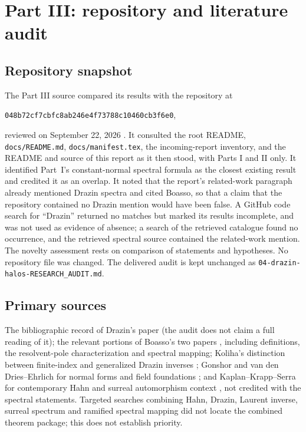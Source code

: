 \documentclass[11pt,a4paper]{article}
\numberwithin{equation}{section}
\theoremstyle{definition}
\theoremstyle{remark}
\newcommand{\commitC}{048b72cf7cbfc8ab246e4f73788c10460cb3f6e0}
\begin{document}
\section{Part III: repository and literature audit}\label{ihs:app:auditC}

\subsection{Repository snapshot}\label{ihs:app:snapshotC}
The Part III source compared its results with the repository at
\begin{center}\small\texttt{\commitC},\end{center}
reviewed on September 22, 2026 \cite{RepoPinC}. It consulted the root
README, \texttt{docs/README.md}, \texttt{docs/manifest.tex}, the
incoming-report inventory, and the README and source of this report as it
then stood, with Parts I and II only. It identified Part~I's
constant-normal spectral formula as the closest existing result and credited
it as an overlap. It noted that the report's related-work paragraph already
mentioned Drazin spectra and cited Boasso, so that a claim that the
repository contained no Drazin mention would have been false. A GitHub code
search for ``Drazin'' returned no matches but marked its results incomplete,
and was not used as evidence of absence; a search of the retrieved catalogue
found no occurrence, and the retrieved spectral source contained the
related-work mention. The novelty assessment rests on comparison of
statements and hypotheses. No repository file was changed. The delivered
audit is kept unchanged as \texttt{04-drazin-halos-RESEARCH\_AUDIT.md}.

\subsection{Primary sources}\label{ihs:app:sourcesC}
The bibliographic record of Drazin's paper \cite{Drazin} (the audit does not
claim a full reading of it); the relevant portions of Boasso's two papers
\cite{BoassoOperators,Boasso}, including definitions, the resolvent-pole
characterization and spectral mapping; Koliha's distinction between
finite-index and generalized Drazin inverses \cite{Koliha}; Gonshor and van
den Dries--Ehrlich for normal forms and field foundations
\cite{Gonshor,DriesEhrlich}; and Kaplan--Krapp--Serra for contemporary Hahn
and surreal automorphism context \cite{KaplanKrappSerra}, not credited with
the spectral statements. Targeted searches combining Hahn, Drazin, Laurent
inverse, surreal spectrum and ramified spectral mapping did not locate the
combined theorem package; this does not establish priority.
\end{document}
